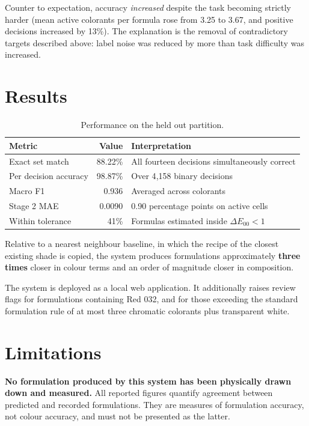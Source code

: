 \documentclass[11pt,a4paper]{article}
\newcommand{\keyfig}[1]{\textcolor{accent}{\textbf{#1}}}
\newcommand{\calloutcolour}{softbg}
\newenvironment{callout}[1][softbg]
  {\renewcommand{\calloutcolour}{#1}%
   \begin{lrbox}{\calloutbox}%
   \begin{minipage}{\dimexpr\textwidth-2\fboxsep-2\fboxrule\relax}%
   \vspace{2pt}}
  {\vspace{2pt}%
   \end{minipage}%
   \end{lrbox}%
   \begin{center}\colorbox{\calloutcolour}{\usebox{\calloutbox}}\end{center}}
\begin{document}
Counter to expectation, accuracy \emph{increased} despite the task becoming
strictly harder (mean active colorants per formula rose from 3.25 to 3.67, and
positive decisions increased by 13\%). The explanation is the removal of
contradictory targets described above: label noise was reduced by more than
task difficulty was increased.

\section{Results}

\begin{table}[h]
\centering
\begin{tabular}{lrl}
\toprule
Metric & Value & Interpretation \\
\midrule
Exact set match          & 88.22\% & All fourteen decisions simultaneously correct \\
Per decision accuracy    & 98.87\% & Over 4{,}158 binary decisions \\
Macro F1                 & 0.936   & Averaged across colorants \\
Stage 2 MAE              & 0.0090  & 0.90 percentage points on active cells \\
Within tolerance         & 41\%    & Formulas estimated inside $\Delta E_{00} < 1$ \\
\bottomrule
\end{tabular}
\caption{Performance on the held out partition.}
\end{table}

Relative to a nearest neighbour baseline, in which the recipe of the closest
existing shade is copied, the system produces formulations approximately
\keyfig{three times} closer in colour terms and an order of magnitude closer in
composition.

The system is deployed as a local web application. It additionally raises review
flags for formulations containing Red 032, and for those exceeding the standard
formulation rule of at most three chromatic colorants plus transparent white.

\section{Limitations}

\begin{callout}[warnbg]
\textbf{No formulation produced by this system has been physically drawn down and
measured.} All reported figures quantify agreement between predicted and recorded
formulations. They are measures of formulation accuracy, not colour accuracy, and
must not be presented as the latter.
\end{callout}
\end{document}

